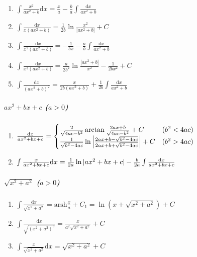 \begin{tiny}
\begin{enumerate}
\item $ \int \frac{x^2}{ax^2+b} \mathrm{d}x = \frac{x}{a} - \frac{b}{a}\int \frac{\mathrm{d}x}{ax^2+b} $

\item $ \int \frac{\mathrm{d}x}{x(ax^2+b)} = \frac{1}{2b} \ln \frac{x^2}{|ax^2+b|} + C $

\item $ \int \frac{\mathrm{d}x}{x^2(ax^2+b)} = -\frac{1}{bx} - \frac{a}{b} \int \frac{\mathrm{d}x}{ax^2+b} $

\item $ \int \frac{\mathrm{d}x}{x^3(ax^2+b)} = \frac{a}{2b^2} \ln \frac{|ax^2+b|}{x^2} - \frac{1}{2bx^2} + C $

\item $ \int \frac{\mathrm{d}x}{(ax^2+b)^2} = \frac{x}{2b(ax^2+b)} + \frac{1}{2b} \int \frac{\mathrm{d}x}{ax^2+b} $

\end{enumerate}

\subparagraph{$ax^2+bx+c$ ($a>0$)}

\begin{enumerate}

\item $ \frac{\mathrm{d} x}{ax^2+bx+c} = \begin{cases}
\frac{2}{\sqrt{4ac-b^2}}\arctan\frac{2ax+b}{\sqrt{4ac-b^2}} + C & (b^2 < 4ac) \\
\frac{1}{\sqrt{b^2-4ac}}\ln\left| \frac{2ax+b-\sqrt{b^2-4ac}}{2ax+b+\sqrt{b^2-4ac}} \right| + C & (b^2 > 4ac)
\end{cases} $

\item $ \int \frac{x}{ax^2+bx+c} \mathrm{d} x = \frac{1}{2a} \ln |ax^2+bx+c| - \frac{b}{2a} \int \frac{\mathrm{d} x}{ax^2+bx+c} $

\end{enumerate}

\subparagraph{$\sqrt{x^2+a^2}$ ($a>0$)}

\begin{enumerate}

\item $ \int \frac{\mathrm{d}x}{\sqrt{x^2+a^2}} = \mathrm{arsh} \frac{x}{a} + C_1 = \ln(x + \sqrt{x^2+a^2}) + C$

\item $ \int \frac{\mathrm{d}x}{\sqrt{(x^2+a^2)^3}} = \frac{x}{a^2\sqrt{x^2+a^2}} + C $

\item $ \int \frac{x}{\sqrt{x^2+a^2}} \mathrm{d}x = \sqrt{x^2+a^2} + C $


\end{enumerate}
\end{tiny}
